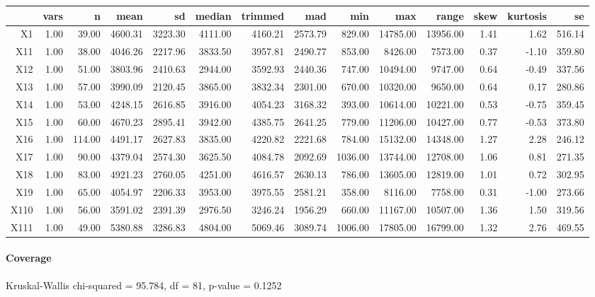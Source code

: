 \begin{tabular}{rrrrrrrrrrrrrr}
  \hline
 & vars & n & mean & sd & median & trimmed & mad & min & max & range & skew & kurtosis & se \\ 
  \hline
X1 & 1.00 & 39.00 & 4600.31 & 3223.30 & 4111.00 & 4160.21 & 2573.79 & 829.00 & 14785.00 & 13956.00 & 1.41 & 1.62 & 516.14 \\ 
  X11 & 1.00 & 38.00 & 4046.26 & 2217.96 & 3833.50 & 3957.81 & 2490.77 & 853.00 & 8426.00 & 7573.00 & 0.37 & -1.10 & 359.80 \\ 
  X12 & 1.00 & 51.00 & 3803.96 & 2410.63 & 2944.00 & 3592.93 & 2440.36 & 747.00 & 10494.00 & 9747.00 & 0.64 & -0.49 & 337.56 \\ 
  X13 & 1.00 & 57.00 & 3990.09 & 2120.45 & 3865.00 & 3832.34 & 2301.00 & 670.00 & 10320.00 & 9650.00 & 0.64 & 0.17 & 280.86 \\ 
  X14 & 1.00 & 53.00 & 4248.15 & 2616.85 & 3916.00 & 4054.23 & 3168.32 & 393.00 & 10614.00 & 10221.00 & 0.53 & -0.75 & 359.45 \\ 
  X15 & 1.00 & 60.00 & 4670.23 & 2895.41 & 3942.00 & 4385.75 & 2641.25 & 779.00 & 11206.00 & 10427.00 & 0.77 & -0.53 & 373.80 \\ 
  X16 & 1.00 & 114.00 & 4491.17 & 2627.83 & 3835.00 & 4220.82 & 2221.68 & 784.00 & 15132.00 & 14348.00 & 1.27 & 2.28 & 246.12 \\ 
  X17 & 1.00 & 90.00 & 4379.04 & 2574.30 & 3625.50 & 4084.78 & 2092.69 & 1036.00 & 13744.00 & 12708.00 & 1.06 & 0.81 & 271.35 \\ 
  X18 & 1.00 & 83.00 & 4921.23 & 2760.05 & 4251.00 & 4616.57 & 2630.13 & 786.00 & 13605.00 & 12819.00 & 1.01 & 0.72 & 302.95 \\ 
  X19 & 1.00 & 65.00 & 4054.97 & 2206.33 & 3953.00 & 3975.55 & 2581.21 & 358.00 & 8116.00 & 7758.00 & 0.31 & -1.00 & 273.66 \\ 
  X110 & 1.00 & 56.00 & 3591.02 & 2391.39 & 2976.50 & 3246.24 & 1956.29 & 660.00 & 11167.00 & 10507.00 & 1.36 & 1.50 & 319.56 \\ 
  X111 & 1.00 & 49.00 & 5380.88 & 3286.83 & 4804.00 & 5069.46 & 3089.74 & 1006.00 & 17805.00 & 16799.00 & 1.32 & 2.76 & 469.55 \\ 
   \hline
\end{tabular}

\paragraph{Coverage}
Kruskal-Wallis chi-squared = 95.784, df = 81, p-value = 0.1252

